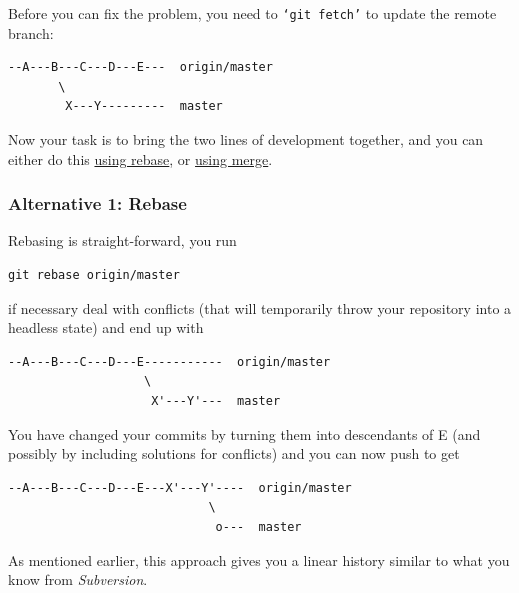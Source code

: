 \documentclass[12pt,pdftex]{article}
\begin{document}
Before you can fix the problem, you need to \texttt{‘git fetch’} to update the
remote branch:
\begin{verbatim}
--A---B---C---D---E---  origin/master
       \
        X---Y---------  master
\end{verbatim}

Now your task is to bring the two lines of development together, and
you can either do this \hyperref[Rebase]{using rebase}, or \hyperref[Merge]{using merge}.


\subsubsection{Alternative 1: Rebase}
\label{sec-5-1-1}

Rebasing is straight-forward, you run
\lstset{frame=single,basicstyle=\ttfamily\footnotesize,language=sh,label= ,caption= ,captionpos=b,numbers=none}
\begin{lstlisting}
git rebase origin/master
\end{lstlisting}
if necessary deal with conflicts (that will temporarily throw your
repository into a headless state) and end up with
\begin{verbatim}
--A---B---C---D---E-----------  origin/master
                   \
                    X'---Y'---  master
\end{verbatim}
You have changed your commits by turning them into descendants of E (and
possibly by including solutions for conflicts) and you can now push to
get
\begin{verbatim}
--A---B---C---D---E---X'---Y'----  origin/master
                            \
                             o---  master
\end{verbatim}
As mentioned earlier, this approach gives you a linear history similar
to what you know from \emph{Subversion}.

\bigskip
\end{document}
